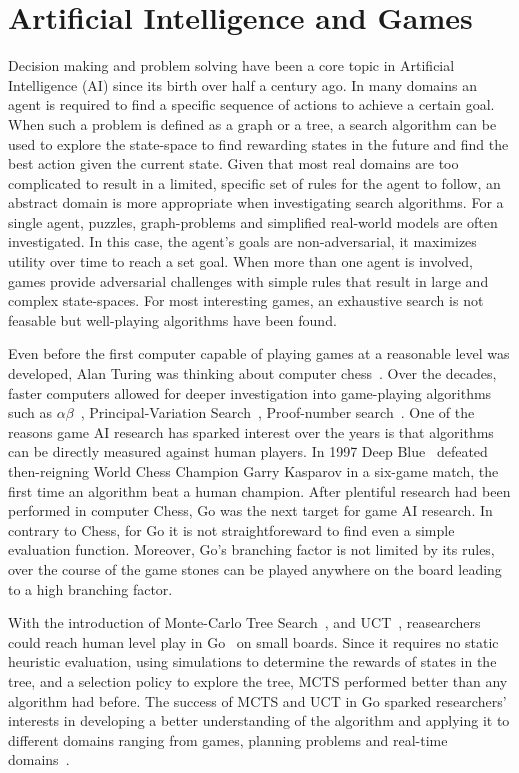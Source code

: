 \documentclass{kecsmstr}
\begin{document}
\section{Artificial Intelligence and Games}
Decision making and problem solving have been a core topic in Artificial Intelligence (AI) since its birth over half a century ago. In many domains an agent is required to find a specific sequence of actions to achieve a certain goal. When such a problem is defined as a graph or a tree, a search algorithm can be used to explore the state-space to find rewarding states in the future and find the best action given the current state.
Given that most real domains are too complicated to result in a limited, specific set of rules for the agent to follow, an abstract domain is more appropriate when investigating search algorithms. For a single agent, puzzles, graph-problems and simplified real-world models are often investigated. In this case, the agent's goals are non-adversarial, it maximizes utility over time to reach a set goal. When more than one agent is involved, games provide adversarial challenges with simple rules that result in large and complex state-spaces. For most interesting games, an exhaustive search is not feasable but well-playing algorithms have been found.

Even before the first computer capable of playing games at a reasonable level was developed, Alan Turing was thinking about computer chess~. Over the decades, faster computers allowed for deeper investigation into game-playing algorithms such as $\alpha\beta$~, Principal-Variation Search~, Proof-number search~. One of the reasons game AI research has sparked interest over the years is that algorithms can be directly measured against human players. In 1997 {\sc Deep Blue}~ defeated then-reigning World Chess Champion Garry Kasparov in a six-game match, the first time an algorithm beat a human champion. After plentiful research had been performed in computer Chess, Go was the next target for game AI research. In contrary to Chess, for Go it is not straightforeward to find even a simple evaluation function. Moreover, Go's branching factor is not limited by its rules, over the course of the game stones can be played anywhere on the board leading to a high branching factor.

With the introduction of Monte-Carlo Tree Search~, and UCT~, reasearchers could reach human level play in Go~ on small boards. Since it requires no static heuristic evaluation, using simulations to determine the rewards of states in the tree, and a selection policy to explore the tree, MCTS performed better than any algorithm had before. The success of MCTS and UCT in Go sparked researchers' interests in developing a better understanding of the algorithm and applying it to different domains ranging from games, planning problems and real-time domains~.
\end{document}
